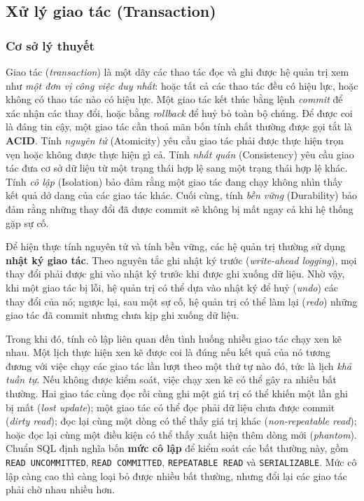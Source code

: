 \subsection{Xử lý giao tác (Transaction)}
\label{subsec:transaction}
\subsubsection{Cơ sở lý thuyết}
\label{subsubsec:tx-theory}

Giao tác (\emph{transaction}) là một dãy các thao tác đọc và ghi được hệ quản trị xem như \emph{một đơn vị công việc duy nhất}: hoặc tất cả các thao tác đều có hiệu lực, hoặc không có thao tác nào có hiệu lực. Một giao tác kết thúc bằng lệnh \emph{commit} để xác nhận các thay đổi, hoặc bằng \emph{rollback} để huỷ bỏ toàn bộ chúng. Để được coi là đáng tin cậy, một giao tác cần thoả mãn bốn tính chất thường được gọi tắt là \textbf{ACID}. Tính \emph{nguyên tử} (Atomicity) yêu cầu giao tác phải được thực hiện trọn vẹn hoặc không được thực hiện gì cả. Tính \emph{nhất quán} (Consistency) yêu cầu giao tác đưa cơ sở dữ liệu từ một trạng thái hợp lệ sang một trạng thái hợp lệ khác. Tính \emph{cô lập} (Isolation) bảo đảm rằng một giao tác đang chạy không nhìn thấy kết quả dở dang của các giao tác khác. Cuối cùng, tính \emph{bền vững} (Durability) bảo đảm rằng những thay đổi đã được commit sẽ không bị mất ngay cả khi hệ thống gặp sự cố.

Để hiện thực tính nguyên tử và tính bền vững, các hệ quản trị thường sử dụng \textbf{nhật ký giao tác}. Theo nguyên tắc ghi nhật ký trước (\emph{write-ahead logging}), mọi thay đổi phải được ghi vào nhật ký trước khi được ghi xuống dữ liệu. Nhờ vậy, khi một giao tác bị lỗi, hệ quản trị có thể dựa vào nhật ký để huỷ (\emph{undo}) các thay đổi của nó; ngược lại, sau một sự cố, hệ quản trị có thể làm lại (\emph{redo}) những giao tác đã commit nhưng chưa kịp ghi xuống dữ liệu.

Trong khi đó, tính cô lập liên quan đến tình huống nhiều giao tác chạy xen kẽ nhau. Một lịch thực hiện xen kẽ được coi là đúng nếu kết quả của nó tương đương với việc chạy các giao tác lần lượt theo một thứ tự nào đó, tức là lịch \emph{khả tuần tự}. Nếu không được kiểm soát, việc chạy xen kẽ có thể gây ra nhiều bất thường. Hai giao tác cùng đọc rồi cùng ghi một giá trị có thể khiến một lần ghi bị mất (\emph{lost update}); một giao tác có thể đọc phải dữ liệu chưa được commit (\emph{dirty read}); đọc lại cùng một dòng có thể thấy giá trị khác (\emph{non-repeatable read}); hoặc đọc lại cùng một điều kiện có thể thấy xuất hiện thêm dòng mới (\emph{phantom}). Chuẩn SQL định nghĩa bốn \textbf{mức cô lập} để kiểm soát các bất thường này, gồm \texttt{READ UNCOMMITTED}, \texttt{READ COMMITTED}, \texttt{REPEATABLE READ} và \texttt{SERIALIZABLE}. Mức cô lập càng cao thì càng loại bỏ được nhiều bất thường, nhưng đổi lại các giao tác phải chờ nhau nhiều hơn.

